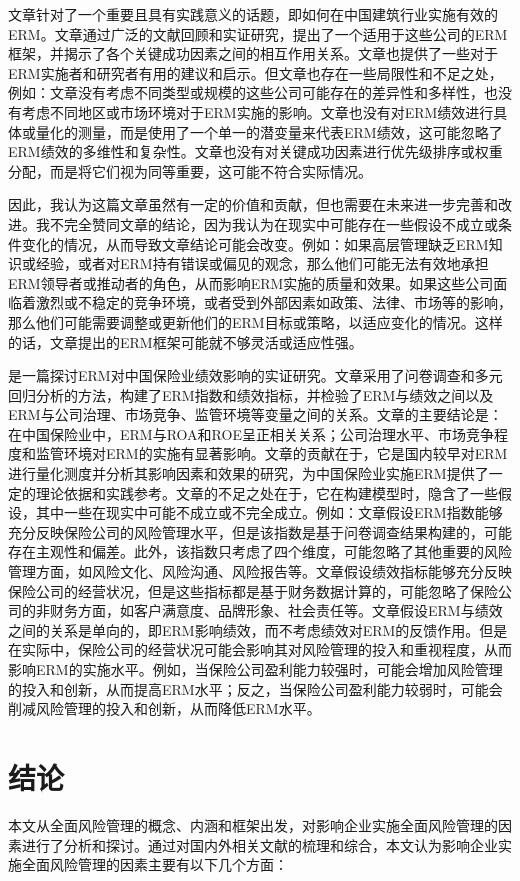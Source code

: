 \documentclass[a4paper,12pt]{ctexart}
\begin{document}
文章针对了一个重要且具有实践意义的话题，即如何在中国建筑行业实施有效的ERM。文章通过广泛的文献回顾和实证研究，提出了一个适用于这些公司的ERM框架，并揭示了各个关键成功因素之间的相互作用关系。文章也提供了一些对于ERM实施者和研究者有用的建议和启示。但文章也存在一些局限性和不足之处，例如：文章没有考虑不同类型或规模的这些公司可能存在的差异性和多样性，也没有考虑不同地区或市场环境对于ERM实施的影响。文章也没有对ERM绩效进行具体或量化的测量，而是使用了一个单一的潜变量来代表ERM绩效，这可能忽略了ERM绩效的多维性和复杂性。文章也没有对关键成功因素进行优先级排序或权重分配，而是将它们视为同等重要，这可能不符合实际情况。

因此，我认为这篇文章虽然有一定的价值和贡献，但也需要在未来进一步完善和改进。我不完全赞同文章的结论，因为我认为在现实中可能存在一些假设不成立或条件变化的情况，从而导致文章结论可能会改变。例如：如果高层管理缺乏ERM知识或经验，或者对ERM持有错误或偏见的观念，那么他们可能无法有效地承担ERM领导者或推动者的角色，从而影响ERM实施的质量和效果。如果这些公司面临着激烈或不稳定的竞争环境，或者受到外部因素如政策、法律、市场等的影响，那么他们可能需要调整或更新他们的ERM目标或策略，以适应变化的情况。这样的话，文章提出的ERM框架可能就不够灵活或适应性强。

\citet{周运涛2011全面风险管理的影响因素研究}是一篇探讨ERM对中国保险业绩效影响的实证研究。文章采用了问卷调查和多元回归分析的方法，构建了ERM指数和绩效指标，并检验了ERM与绩效之间以及ERM与公司治理、市场竞争、监管环境等变量之间的关系。文章的主要结论是：在中国保险业中，ERM与ROA和ROE呈正相关关系；公司治理水平、市场竞争程度和监管环境对ERM的实施有显著影响。文章的贡献在于，它是国内较早对ERM进行量化测度并分析其影响因素和效果的研究，为中国保险业实施ERM提供了一定的理论依据和实践参考。文章的不足之处在于，它在构建模型时，隐含了一些假设，其中一些在现实中可能不成立或不完全成立。例如：文章假设ERM指数能够充分反映保险公司的风险管理水平，但是该指数是基于问卷调查结果构建的，可能存在主观性和偏差。此外，该指数只考虑了四个维度，可能忽略了其他重要的风险管理方面，如风险文化、风险沟通、风险报告等。文章假设绩效指标能够充分反映保险公司的经营状况，但是这些指标都是基于财务数据计算的，可能忽略了保险公司的非财务方面，如客户满意度、品牌形象、社会责任等。文章假设ERM与绩效之间的关系是单向的，即ERM影响绩效，而不考虑绩效对ERM的反馈作用。但是在实际中，保险公司的经营状况可能会影响其对风险管理的投入和重视程度，从而影响ERM的实施水平。例如，当保险公司盈利能力较强时，可能会增加风险管理的投入和创新，从而提高ERM水平；反之，当保险公司盈利能力较弱时，可能会削减风险管理的投入和创新，从而降低ERM水平。
\section{结论}
本文从全面风险管理的概念、内涵和框架出发，对影响企业实施全面风险管理的因素进行了分析和探讨。通过对国内外相关文献的梳理和综合，本文认为影响企业实施全面风险管理的因素主要有以下几个方面：
\end{document}
